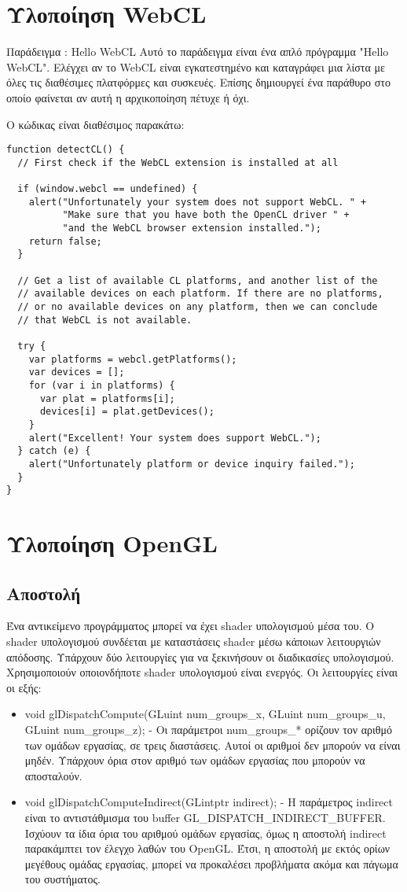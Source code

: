 \section{Υλοποίηση WebCL}
Παράδειγμα : Hello WebCL
Αυτό το παράδειγμα είναι ένα απλό πρόγραμμα "Hello WebCL". Ελέγχει αν το WebCL είναι εγκατεστημένο και καταγράφει μια λίστα με όλες τις διαθέσιμες πλατφόρμες και συσκευές. Επίσης δημιουργεί ένα παράθυρο στο οποίο φαίνεται αν αυτή η αρχικοποίηση πέτυχε ή όχι. 

Ο κώδικας είναι διαθέσιμος παρακάτω:
\begin{lstlisting}[basicstyle=\scriptsize]
function detectCL() {
  // First check if the WebCL extension is installed at all
  
  if (window.webcl == undefined) {
    alert("Unfortunately your system does not support WebCL. " +
          "Make sure that you have both the OpenCL driver " +
          "and the WebCL browser extension installed.");
    return false;
  }

  // Get a list of available CL platforms, and another list of the
  // available devices on each platform. If there are no platforms,
  // or no available devices on any platform, then we can conclude
  // that WebCL is not available.

  try {
    var platforms = webcl.getPlatforms();
    var devices = [];
    for (var i in platforms) {
      var plat = platforms[i];
      devices[i] = plat.getDevices();
    }
    alert("Excellent! Your system does support WebCL.");
  } catch (e) {
    alert("Unfortunately platform or device inquiry failed.");
  }
}
\end{lstlisting}

\section{Υλοποίηση OpenGL}
\subsection{Αποστολή}
Ένα αντικείμενο προγράμματος μπορεί να έχει shader υπολογισμού μέσα του. Ο shader υπολογισμού συνδέεται με καταστάσεις shader μέσω κάποιων λειτουργιών απόδοσης. Υπάρχουν δύο λειτουργίες για να ξεκινήσουν οι διαδικασίες υπολογισμού. Χρησιμοποιούν οποιονδήποτε shader υπολογισμού είναι ενεργός. Οι λειτουργίες είναι οι εξής:
\begin{itemize}
\item void glDispatchCompute(GLuint num\_groups\_x, GLuint num\_groups\_u, GLuint num\_groups\_z); - Οι παράμετροι num\_groups\_* ορίζουν τον αριθμό των ομάδων εργασίας, σε τρεις διαστάσεις. Αυτοί οι αριθμοί δεν μπορούν να είναι μηδέν. Υπάρχουν όρια στον αριθμό των ομάδων εργασίας που μπορούν να αποσταλούν.
\item void glDispatchComputeIndirect(GLintptr indirect); - H παράμετρος indirect είναι το αντιστάθμισμα του buffer GL\_DISPATCH\_INDIRECT\_BUFFER. Ισχύουν τα ίδια όρια του αριθμού ομάδων εργασίας, όμως η αποστολή indirect παρακάμπτει τον έλεγχο λαθών του OpenGL. Έτσι, η αποστολή με εκτός ορίων μεγέθους ομάδας εργασίας, μπορεί να προκαλέσει προβλήματα ακόμα και πάγωμα του συστήματος.
\end{itemize}
